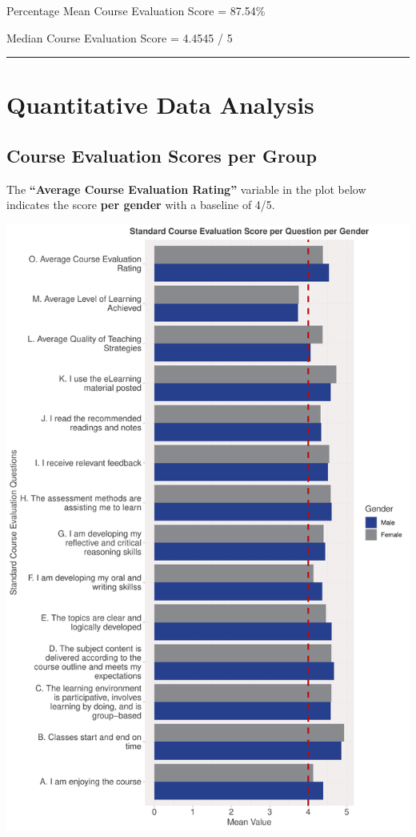 \documentclass[
]{article}
\begin{document}
Percentage Mean Course Evaluation Score = 87.54\%

Median Course Evaluation Score = 4.4545 / 5

\begin{center}\rule{0.5\linewidth}{0.5pt}\end{center}

\newpage

\section{Quantitative Data Analysis}\label{quantitative-data-analysis}

\subsection{Course Evaluation Scores per
Group}\label{course-evaluation-scores-per-group}

The \textbf{``Average Course Evaluation Rating''} variable in the plot
below indicates the score \textbf{per gender} with a baseline of 4/5.

\includegraphics{Mid-SemesterCourseEvaluation-20240819-20241125-ADB-BBIT2.2_files/figure-latex/VisualizationsForCourseEvaluationResultsperGender-1.pdf}
\end{document}
